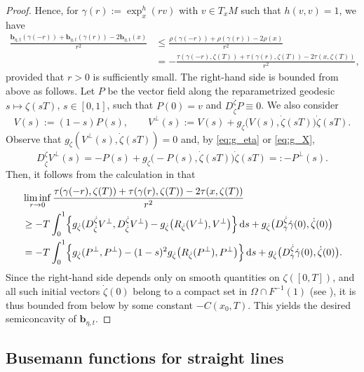 \documentclass[a4paper,11pt]{article}
\numberwithin{equation}{section}
\theoremstyle{definition}
\theoremstyle{plain}
\newcommand{\dd}{\mathrm{d}}
\newcommand{\bb}{\ensuremath{\mathbf{b}}}
\begin{document}
\begin{proof}
Hence, for $\gamma(r):=\exp^h_x(rv)$ with $v \in T_xM$ such that $h(v,v)=1$, we have
\begin{align*}
\frac{\bb_{\eta,t}(\gamma(-r)) +\bb_{\eta,t}(\gamma(r)) -2\bb_{\eta,t}(x)}{r^2}
&\le \frac{\rho(\gamma(-r)) +\rho(\gamma(r)) -2\rho(x)}{r^2} \\
&= -\frac{\tau(\gamma(-r),\zeta(T)) +\tau(\gamma(r),\zeta(T)) -2\tau(x,\zeta(T))}{r^2},
\end{align*}
provided that $r>0$ is sufficiently small.
The right-hand side is bounded from above as follows.
Let $P$ be the vector field along the reparametrized geodesic $s \longmapsto \zeta(sT)$, $s \in [0,1]$, such that $P(0)=v$ and $D^{\dot{\zeta}}_{\dot{\zeta}} P \equiv 0$.
We also consider
\[ V(s) :=(1-s) P(s), \qquad
V^{\perp}(s) :=V(s) +g_{\dot{\zeta}}\bigl( V(s),\dot{\zeta}(sT) \bigr) \dot{\zeta}(sT). \]
Observe that $g_{\dot{\zeta}}(V^\perp(s),\dot{\zeta}(sT))=0$ and, by \eqref{eq:g_eta} or \eqref{eq:g_X},
\[ D^{\dot{\zeta}}_{\dot{\zeta}} V^{\perp}(s)
=-P(s) +g_{\dot{\zeta}}\bigl( -P(s),\dot{\zeta}(sT) \bigr) \dot{\zeta}(sT)
=:-P^{\perp}(s). \]
Then, it follows from the calculation in  \cite[Proposition~3.9]{BO} that
\begin{align*}
&\liminf_{r \to 0} \frac{\tau(\gamma(-r),\zeta(T)) +\tau(\gamma(r),\zeta(T)) -2\tau(x,\zeta(T))}{r^2} \\
&\ge -T \int_0^1 \Bigl\{ g_{\dot{\zeta}}(D^{\dot{\zeta}}_{\dot{\zeta}} V^{\perp},D^{\dot{\zeta}}_{\dot{\zeta}} V^{\perp}) -g_{\dot{\zeta}}\bigl( R_{\dot{\zeta}}(V^\perp),V^\perp \bigr) \Bigr\} \,\dd s
+g_{\dot{\zeta}}\bigl( D^{\dot{\zeta}}_{\dot{\gamma}} \dot{\gamma}(0),\dot{\zeta}(0) \bigr) \\
&= -T \int_0^1 \Bigl\{ g_{\dot{\zeta}}(P^\perp,P^\perp) -(1-s)^2 g_{\dot{\zeta}}\bigl( R_{\dot{\zeta}}(P^\perp),P^\perp \bigr) \Bigr\} \,\dd s
+g_{\dot{\zeta}}\bigl( D^{\dot{\zeta}}_{\dot{\gamma}} \dot{\gamma}(0),\dot{\zeta}(0) \bigr).
\end{align*}
Since the right-hand side depends only on smooth quantities on $\zeta([0,T])$, and all such initial vectors $\dot{\zeta}(0)$ belong to a compact set in $\Omega \cap F^{-1}(1)$ (see  \cite[Lemma~3.4]{GH}), it is thus bounded from below by some constant $-C(x_0,T)$.
This yields the desired semiconcavity of $\bb_{\eta,t}$. 
\end{proof}

\subsection{Busemann functions for straight lines}\label{ssc:lines}
\end{document}
